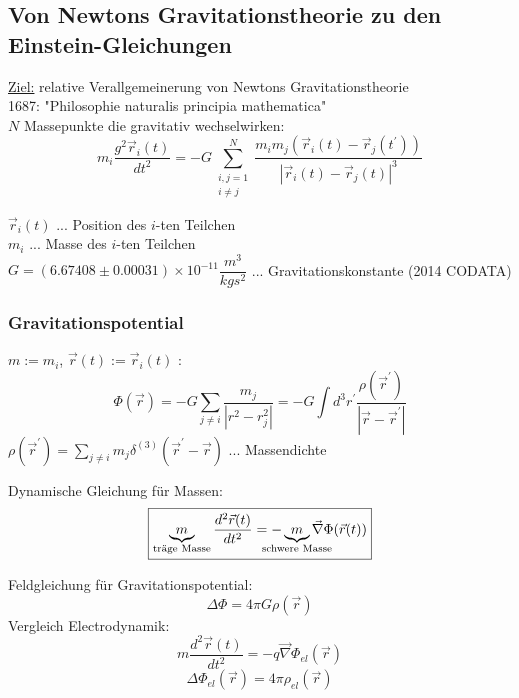 \documentclass[a4paper, 11pt]{article}
\begin{document}
\subsection{Von Newtons Gravitationstheorie zu den Einstein-Gleichungen}
\underline{Ziel:} relative Verallgemeinerung von Newtons Gravitationstheorie\\
1687: "Philosophie naturalis principia mathematica"\\
$N$ Massepunkte die gravitativ wechselwirken: \\
\begin{equation*}
m_i \dfrac{g^2\vec{r}_i(t)}{dt^2} = - G \sum^N_{\substack{i,j = 1\\ i \neq j}} \dfrac{m_i m_j (\vec{r} _i(t)-\vec{r}_j(t^\prime))}{|\vec{r}_i(t) - \vec{r}_j(t)|^3}
\end{equation*}

$\vec{r}_i(t)$ ... Position des $i$-ten Teilchen\\
$m_i$ ... Masse des $i$-ten Teilchen \\
$G = (6.67408 \pm 0.00031)\times 10^{-11} \dfrac{m^3}{kg s^2}$ ... Gravitationskonstante (2014 CODATA)

\subsubsection*{Gravitationspotential}
$m:= m_i$, $\vec{r}(t):= \vec{r}_i(t)$ :
\begin{equation*}
\Phi(\vec{r}) = - G \sum_{j \neq i} \dfrac{m_j}{|r^2-r_j^2|} = -G \int d^3r^\prime \dfrac{\rho(\vec{r}^\prime)}{|\vec{r}-\vec{r}^\prime|}
\end{equation*}
$\rho(\vec{r}^\prime)=\sum\limits_{j\neq i} m_j \delta^{(3)}(\vec{r}^\prime-\vec{r})$ ... Massendichte


Dynamische Gleichung für Massen:
\begin{equation*}
\boxed{
\underbrace{m}_{\text{träge Masse}} \dfrac{d^2\vec{r}(t)}{dt^2} = -\underbrace{m}_{\mathclap{\text{schwere Masse}}} \vec{\nabla} \Phi(\vec{r}(t))
}
\end{equation*}

Feldgleichung für Gravitationspotential:
\begin{equation*}
\boxed{
\Delta \Phi = 4 \pi G \rho(\vec{r})
}
\end{equation*}
Vergleich Electrodynamik:
\begin{equation*}
m \dfrac{d^2 \vec{r}(t)}{dt^2} = - q \vec{\nabla} \Phi_{el}(\vec{r})
\end{equation*}
\begin{equation*}
\Delta \Phi_{el}(\vec{r}) = 4 \pi \rho_{el}(\vec{r})
\end{equation*}
\end{document}
